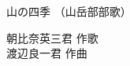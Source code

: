\documentclass[10pt,b5j]{tarticle} %
\begin{document}
\begin{minipage}[c]{0.7\hsize} %
    \begin{center}
        {\LARGE
            山の四季 %
        }
        {\small 
            （山岳部部歌） %
        }
    \end{center}
\end{minipage}
\begin{minipage}[c]{0.3\hsize} %
    \begin{flushright} %
        朝比奈英三君 作歌\\渡辺良一君 作曲 %
    \end{flushright}
\end{minipage}

\vspace{1.5em} %
\newcommand{\linespace}{0.5em} %
\newcommand{\blocksize}{0.5\hsize} %
\newcommand{\itemmargin}{6em} %
\begin{enumerate} %
    \setlength{\itemindent}{\itemmargin} %
    \begin{minipage}[c]{\blocksize}
    
        
    
    \end{minipage}
\end{enumerate} %
\end{document}
